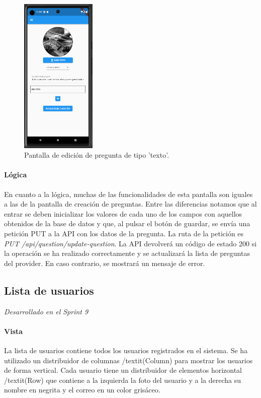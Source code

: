 \begin{figure}[H]
  \centering
  \includegraphics[width=0.32\textwidth]{imagenes/c7/editarpreguntatexto.png}
  \caption{Pantalla de edición de pregunta de tipo 'texto'.} 
  \label{fig:edición_pregunta_tecto}
\end{figure}


\paragraph*{Lógica}
En cuanto a la lógica, muchas de las funcionalidades de esta pantalla son iguales a las de la pantalla de creación de preguntas.
Entre las diferencias notamos que al entrar se deben inicializar los valores de cada uno de los campos con aquellos obtenidos de la base de datos y que, al pulsar el botón de guardar, se envía una petición PUT a la API con los datos de la pregunta. La ruta de la petición es \textit{PUT /api/question/update-question}. La API devolverá un código de estado 200 si la operación se ha realizado correctamente y se actualizará la lista de preguntas del provider. En caso contrario, se mostrará un mensaje de error.


\newpage
\subsection{Lista de usuarios} 

\textit{Desarrollado en el Sprint 9}

\paragraph*{Vista}
La lista de usuarios contiene todos los usuarios registrados en el sistema. Se ha utilizado un distribuidor de columnas /textit{(Column)} para mostrar los usuarios de forma vertical. 
Cada usuario tiene un distribuidor de elementos horizontal /textit{(Row)} que contiene a la izquierda la foto del usuario y a la derecha su nombre en negrita y el correo en un color grisáceo. 

